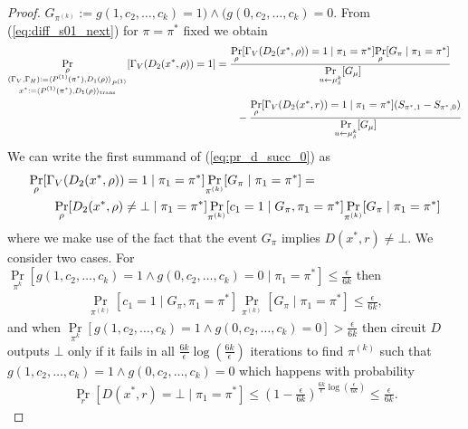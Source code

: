 \begin{proof}
$G_{\pi^{(k)}} := g(1, c_2, \dots, c_k) = 1) \land (g(0, c_2, \dots, c_k) = 0$.
From (\ref{eq:diff_s01_next}) for $\pi = \pi^*$ fixed we obtain
\begin{align}
\label{eq:pr_d_succ_0}
  \underset{\substack{\rho \\ (\Gamma_V,\Gamma_H) := \langle P^{(1)}(\pi^*), D_1(\rho) \rangle_{P^{(1)}} \\ x^* := \langle P^{(1)}(\pi^*), D_1(\rho) \rangle_{\text{trans}}}}{\Pr}[\Gamma_V(D_2(x^*, \rho)) = 1] &=
  \frac{\underset{\rho}{\Pr}[\Gamma_V(D_2(x^*, \rho)) = 1 \mid \pi_1 = \pi^*] \underset{\rho}{\Pr}[G_{\pi} \mid \pi_1 = \pi^*]} {\underset{u \leftarrow \mu_{\delta}^{k}}{\Pr}[G_{\mu}]} \notag\\
  & \mbox\qquad - \frac{\underset{\rho}{\Pr}[\Gamma_V(D_2(x^*, r)) = 1 \mid \pi_1 = \pi^*](S_{\pi^*,1} - S_{\pi^*,0})}{\underset{u \leftarrow \mu_{\delta}^{k}}{\Pr}[G_{\mu}]}
\end{align}
%
We can write the first summand of (\ref{eq:pr_d_succ_0}) as
\begin{align}
  &\underset{\rho}{\Pr}[\Gamma_V(D_2(x^*,\rho)) = 1 \mid \pi_1 = \pi^*] \underset{\pi^{(k)}}{\Pr}[G_{\pi} \mid \pi_1 = \pi^*] = \notag\\
  &\mbox\qquad \underset{\rho}{\Pr}[D_2(x^*,\rho) \neq \bot \mid \pi_1 = \pi^*]
  \underset{\pi^{(k)}}{\Pr}[c_1 = 1 \mid G_{\pi}, \pi_1 = \pi^*]
  \underset{\pi^{(k)}}{\Pr}[G_{\pi} \mid \pi_1 = \pi^*]
\end{align}
where we make use of the fact that the event $G_{\pi}$ implies $D(x^*, r) \neq \bot$.
We consider two cases.
For $\underset{\pi^{k}}{\Pr}[g(1, c_2, \dots, c_k) = 1 \land g(0, c_2, \dots,c_k ) = 0 \mid \pi_1 = \pi^*] \leq \frac{\epsilon}{6k}$ then
\begin{align}
  \underset{\pi^{(k)}}{\Pr}[c_1 = 1 \mid G_{\pi}, \pi_1 = \pi^*] \underset{\pi^{(k)}}{\Pr}[G_{\pi} \mid \pi_1 = \pi^*] \leq \frac{\epsilon}{6k},
\end{align}
and when $\underset{\pi^{k}}{\Pr}[g(1, c_2, \dots, c_k) = 1 \land g(0, c_2, \dots,c_k ) = 0] > \frac{\epsilon}{6k}$ then circuit $D$ outputs $\bot$
only if it fails in all $\frac{6k}{\epsilon} \log(\frac{6k}{\epsilon})$ iterations to find $\pi^{(k)}$ such that $g(1, c_2, \dots, c_k) = 1 \land g(0, c_2, \dots, c_k) = 0$
which happens with probability
\begin{align}
\underset{r}{\Pr}[D(x^*,r) = \bot \mid \pi_1 = \pi^*] \leq (1 - \frac{\epsilon}{6k})^{\frac{6k}{\epsilon}\log(\frac{\epsilon}{6k})} \leq \frac{\epsilon}{6k}.

\end{align}
\end{proof}
